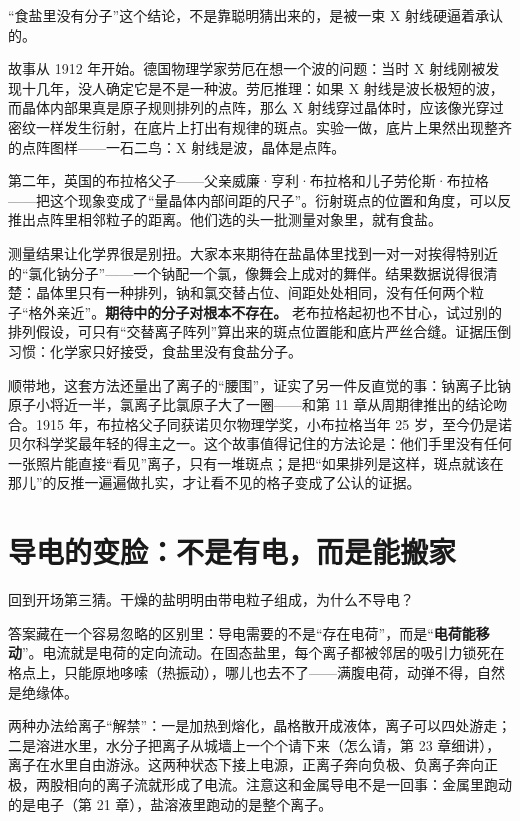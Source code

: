 \begin{zhengju}
“食盐里没有分子”这个结论，不是靠聪明猜出来的，是被一束 X 射线硬逼着承认的。

故事从 1912 年开始。德国物理学家劳厄在想一个波的问题：当时 X 射线刚被发现十几年，没人确定它是不是一种波。劳厄推理：如果 X 射线是波长极短的波，而晶体内部果真是原子规则排列的点阵，那么 X 射线穿过晶体时，应该像光穿过密纹一样发生衍射，在底片上打出有规律的斑点。实验一做，底片上果然出现整齐的点阵图样——一石二鸟：X 射线是波，晶体是点阵。

第二年，英国的布拉格父子——父亲威廉·亨利·布拉格和儿子劳伦斯·布拉格——把这个现象变成了“量晶体内部间距的尺子”。衍射斑点的位置和角度，可以反推出点阵里相邻粒子的距离。他们选的头一批测量对象里，就有食盐。

测量结果让化学界很是别扭。大家本来期待在盐晶体里找到一对一对挨得特别近的“氯化钠分子”——一个钠配一个氯，像舞会上成对的舞伴。结果数据说得很清楚：晶体里只有一种排列，钠和氯交替占位、间距处处相同，没有任何两个粒子“格外亲近”。\textbf{期待中的分子对根本不存在。} 老布拉格起初也不甘心，试过别的排列假设，可只有“交替离子阵列”算出来的斑点位置能和底片严丝合缝。证据压倒习惯：化学家只好接受，食盐里没有食盐分子。

顺带地，这套方法还量出了离子的“腰围”，证实了另一件反直觉的事：钠离子比钠原子小将近一半，氯离子比氯原子大了一圈——和第 11 章从周期律推出的结论吻合。1915 年，布拉格父子同获诺贝尔物理学奖，小布拉格当年 25 岁，至今仍是诺贝尔科学奖最年轻的得主之一。这个故事值得记住的方法论是：他们手里没有任何一张照片能直接“看见”离子，只有一堆斑点；是把“如果排列是这样，斑点就该在那儿”的反推一遍遍做扎实，才让看不见的格子变成了公认的证据。
\end{zhengju}

\section{导电的变脸：不是有电，而是能搬家}

回到开场第三猜。干燥的盐明明由带电粒子组成，为什么不导电？

答案藏在一个容易忽略的区别里：导电需要的不是“存在电荷”，而是“\textbf{电荷能移动}”。电流就是电荷的定向流动。在固态盐里，每个离子都被邻居的吸引力锁死在格点上，只能原地哆嗦（热振动），哪儿也去不了——满腹电荷，动弹不得，自然是绝缘体。

两种办法给离子“解禁”：一是加热到熔化，晶格散开成液体，离子可以四处游走；二是溶进水里，水分子把离子从城墙上一个个请下来（怎么请，第 23 章细讲），离子在水里自由游泳。这两种状态下接上电源，正离子奔向负极、负离子奔向正极，两股相向的离子流就形成了电流。注意这和金属导电不是一回事：金属里跑动的是电子（第 21 章），盐溶液里跑动的是整个离子。

